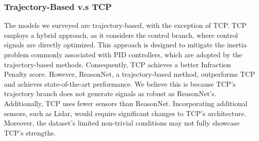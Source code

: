 \subsubsection{Trajectory-Based v.s TCP}

The models we surveyed are trajectory-based, with the exception of TCP. TCP employs a hybrid approach, as it considers the control branch, where control signals are directly optimized. This approach is designed to mitigate the inertia problem commonly associated with PID controllers, which are adopted by the trajectory-based methods. Consequently, TCP achieves a better Infraction Penalty score. However, ReasonNet, a trajectory-based method, outperforms TCP and achieves state-of-the-art performance. We believe this is because TCP's trajectory branch does not generate signals as robust as ReasonNet's. Additionally, TCP uses fewer sensors than ReasonNet. Incorporating additional sensors, such as Lidar, would require significant changes to TCP's architecture. Moreover, the dataset's limited non-trivial conditions may not fully showcase TCP's strengths.






